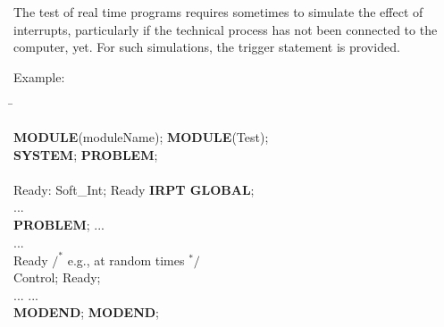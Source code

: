 The test of real time programs requires sometimes to simulate the effect
of interrupts, particularly if the technical process has not been
connected to the computer, yet. For such simulations, the trigger
statement is provided.


Example:

\begin{tabbing}
\hspace{6cm} \= \kill

{\bf MODULE}(moduleName);     \> {\bf MODULE}(Test);\\
{\bf SYSTEM};                 \> {\bf PROBLEM};\\
         \> \\
\x Ready: Soft\_Int;          \>  Ready {\bf IRPT GLOBAL};\\
\x ...                        \> \\
{\bf PROBLEM};                \> \x ...\\
\x ...                        \> \\
 Ready           \> \x $/^*$ e.g., at random times $^*/$ \\
\x {} Control; \>  Ready;\\
\x ...                        \> \x ...\\
{\bf MODEND};                 \> {\bf MODEND};
\end{tabbing}

